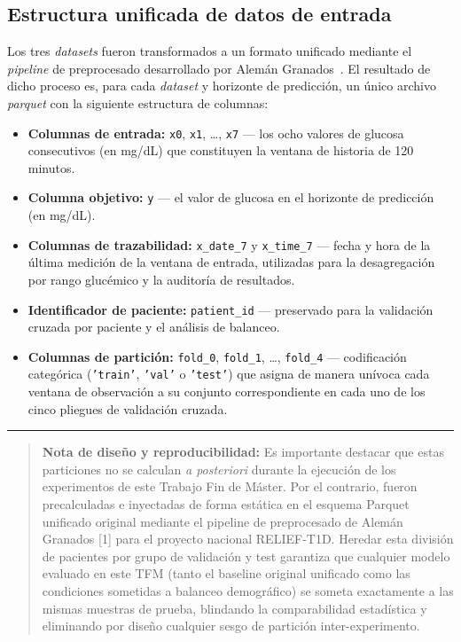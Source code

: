 \subsection{Estructura unificada de datos de entrada}
\label{subsec:estructura_datos_entrada}

Los tres \textit{datasets} fueron transformados a un formato unificado mediante el \textit{pipeline} de preprocesado desarrollado por Alemán Granados~\cite{antoniotfg}. El resultado de dicho proceso es, para cada \textit{dataset} y horizonte de predicción, un único archivo \textit{parquet} con la siguiente estructura de columnas:

\begin{itemize}
    \item \textbf{Columnas de entrada:} \texttt{x0}, \texttt{x1}, \ldots, \texttt{x7} --- los ocho valores de glucosa consecutivos (en mg/dL) que constituyen la ventana de historia de 120 minutos.
    \item \textbf{Columna objetivo:} \texttt{y} --- el valor de glucosa en el horizonte de predicción (en mg/dL).
    \item \textbf{Columnas de trazabilidad:} \texttt{x\_date\_7} y \texttt{x\_time\_7} --- fecha y hora de la última medición de la ventana de entrada, utilizadas para la desagregación por rango glucémico y la auditoría de resultados.
    \item \textbf{Identificador de paciente:} \texttt{patient\_id} --- preservado para la validación cruzada por paciente y el análisis de balanceo.
    \item \textbf{Columnas de partición:} \texttt{fold\_0}, \texttt{fold\_1}, \ldots, \texttt{fold\_4} --- codificación categórica (\texttt{'train'}, \texttt{'val'} o \texttt{'test'}) que asigna de manera unívoca cada ventana de observación a su conjunto correspondiente en cada uno de los cinco pliegues de validación cruzada.
\end{itemize}

\vspace{0.5em}
\hrule
\vspace{0.5em}

\begin{quote}
    \small \textbf{Nota de diseño y reproducibilidad:} Es importante destacar que estas particiones no se calculan \textit{a posteriori} durante la ejecución de los experimentos de este Trabajo Fin de Máster. Por el contrario, fueron precalculadas e inyectadas de forma estática en el esquema Parquet unificado original mediante el pipeline de preprocesado de Alemán Granados [1] para el proyecto nacional RELIEF-T1D. Heredar esta división de pacientes por grupo de validación y test garantiza que cualquier modelo evaluado en este TFM (tanto el baseline original unificado como las condiciones sometidas a balanceo demográfico) se someta exactamente a las mismas muestras de prueba, blindando la comparabilidad estadística y eliminando por diseño cualquier sesgo de partición inter-experimento.
\end{quote}

